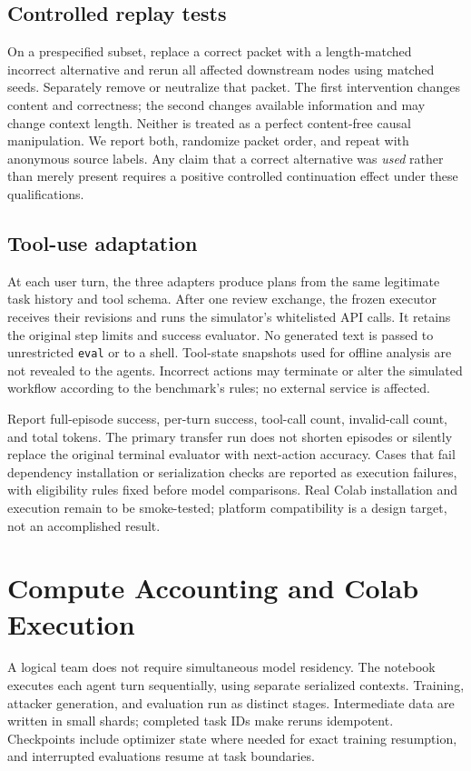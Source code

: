 \documentclass[10pt,twocolumn]{article}
\begin{document}
\subsection{Controlled replay tests}
On a prespecified subset, replace a correct packet with a length-matched incorrect alternative and rerun all affected downstream nodes using matched seeds. Separately remove or neutralize that packet. The first intervention changes content and correctness; the second changes available information and may change context length. Neither is treated as a perfect content-free causal manipulation. We report both, randomize packet order, and repeat with anonymous source labels. Any claim that a correct alternative was \emph{used} rather than merely present requires a positive controlled continuation effect under these qualifications.

\subsection{Tool-use adaptation}
At each user turn, the three adapters produce plans from the same legitimate task history and tool schema. After one review exchange, the frozen executor receives their revisions and runs the simulator's whitelisted API calls. It retains the original step limits and success evaluator. No generated text is passed to unrestricted \texttt{eval} or to a shell. Tool-state snapshots used for offline analysis are not revealed to the agents. Incorrect actions may terminate or alter the simulated workflow according to the benchmark's rules; no external service is affected.

Report full-episode success, per-turn success, tool-call count, invalid-call count, and total tokens. The primary transfer run does not shorten episodes or silently replace the original terminal evaluator with next-action accuracy. Cases that fail dependency installation or serialization checks are reported as execution failures, with eligibility rules fixed before model comparisons. Real Colab installation and execution remain to be smoke-tested; platform compatibility is a design target, not an accomplished result.

\section{Compute Accounting and Colab Execution}
\label{app:compute}
A logical team does not require simultaneous model residency. The notebook executes each agent turn sequentially, using separate serialized contexts. Training, attacker generation, and evaluation run as distinct stages. Intermediate data are written in small shards; completed task IDs make reruns idempotent. Checkpoints include optimizer state where needed for exact training resumption, and interrupted evaluations resume at task boundaries.
\end{document}
